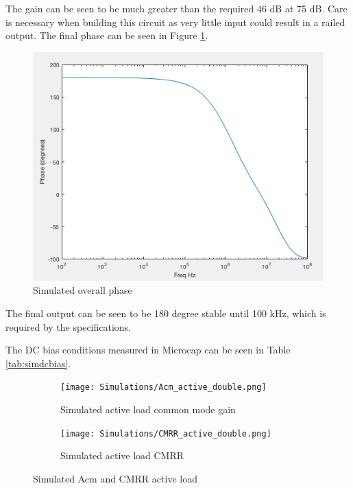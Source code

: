 The gain can be seen to be much greater than the required 46 dB at 75 dB. Care is necessary when building this circuit as very little input could result in a railed output. The final phase can be seen in Figure \ref{fig:overallphase}.


\begin{figure}[H]
	\begin{center}
		\includegraphics[scale=.30]{Simulations/phaseoverall.png}
		\caption{Simulated overall phase}
		\label{fig:overallphase}
	\end{center}
\end{figure} 

The final output can be seen to be 180 degree stable until 100 kHz, which is required by the specifications.

The DC bias conditions measured in Microcap can be seen in Table \ref{tab:simdcbias}.




	

\begin{figure}[H]
    \begin{subfigure}[b]{0.45\textwidth}
    \centering
    \texttt{[image: Simulations/Acm\_active\_double.png]}
    \caption{Simulated active load common mode gain}
    \label{fig:activeAcsim}
    \end{subfigure}
    \hfill
    \begin{subfigure}[b]{0.45\textwidth}
    \centering
    \texttt{[image: Simulations/CMRR\_active\_double.png]}
    \caption{Simulated active load CMRR}
    \label{fig:activeCMRRsim}
\end{subfigure}
    \caption{Simulated Acm and CMRR active load}
    \label{fig:acmcmrrsimactive}
\end{figure} 


